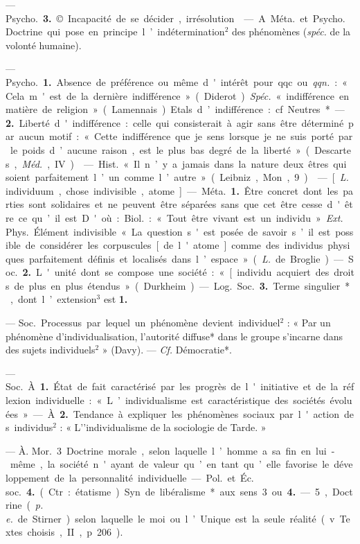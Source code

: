 \begin{itemize}[leftmargin=1cm, label=, itemsep=1pt]
— \si{Psycho.} {\bf 3.} ©. Incapacité de se
décider, irrésolution.

 — A. \si{Méta.} et \si{Psycho.} Doctrine qui pose en principe
l’indétermination$^2$ des phénomènes
({\it spéc.} de la volonté humaine).

 — \si{Psycho.} {\bf 1.} Absence
de préférence ou même d'intérêt
pour qqc. ou {\it qqn.} : « Cela m'est de
la dernière indifférence » (Diderot).
{\it Spéc.} « indifférence en matière de
religion » (Lamennais). Etals d’indifférence : cf. Neutres*. — {\bf 2.} Liberté
d'indifférence : celle qui consisterait
à agir sans être déterminé par
aucun motif : « Cette indifférence
que je sens lorsque je ne suis porté...
par le poids d’aucune raison, est le
plus bas degré de la liberté » (Descartes, \si{{\it Méd.}}, IV).

 — \si{Hist.}
« Il n’y a jamais dans la nature deux
êtres qui soient parfaitement l’un
comme l’autre » (Leibniz, Mon., 9).

 — [{\it L.} individuum, chose indivisible, atome] — \si{Méta.} {\bf 1.} Être concret dont les parties sont solidaires
et ne peuvent être séparées sans que
cet être cesse d'être ce qu’il est.
D'où : \si{Biol.} : « Tout être vivant est
un individu ». {\it Ext.} \si{Phys.} Élément
indivisible « La question s'est
posée de savoir s’il est possible de
considérer les corpuscules [de
l'atome] comme des individus physiques parfaitement définis et localisés dans l’espace » ({\it L.} de Broglie).

— \si{Soc.} {\bf 2.} L'unité dont se compose une société : « [individu
acquiert des droits de plus en plus
étendus » (Durkheim).

— \si{Log.} \si{Soc.} {\bf 3.} Terme singulier*, dont l’extension$^3$ est {\bf 1.}

 — \si{Soc.} Processus
par lequel un phénomène devient
individuel$^2$ : « Par un phénomène
d’individualisation, l'autorité diffuse* dans le groupe s’incarne dans
des sujets individuels$^2$ » (Davy). —
{\it {\it Cf.}} Démocratie*.

 — \si{Soc.} À. {\bf 1.} État de
fait caractérisé par les progrès de
l'initiative et de la réflexion individuelle : « L’individualisme est
caractéristique des sociétés évoluées. » — À. {\bf 2.} Tendance à expliquer les phénomènes sociaux par
l'action des individus$^2$ : « L'’individualisme de la sociologie de Tarde. »

— À. \si{Mor.} 3 Doctrine morale,
selon laquelle l’homme a sa fin en
lui-même, la société n'ayant de valeur qu’en tant qu’elle favorise le
développement de la personnalité
individuelle. — \si{Pol.} et \si{Éc. soc.}
 {\bf 4.} (Ctr. : étatisme). Syn. de libéralisme* aux sens 3 ou {\bf 4.} — 5, Doctrine ({\it p. e.} de Stirner) selon laquelle
le moi ou l’Unique est la seule réalité
(v. Textes choisis, II, p. 206).


\end{itemize}
